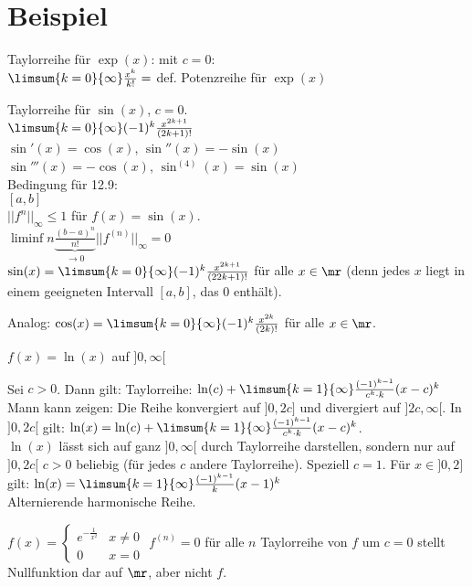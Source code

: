 \section{Beispiel}
	\item  Taylorreihe für $ \exp(x) $: mit $ c=0 $:\\
	$ \limsum{k=0}{\infty}\frac{x^k}{k!}= $ def. Potenzreihe für $ \exp(x) $
	\item  Taylorreihe für $ \sin(x) $, $ c=0 $.\\
	$ \limsum{k=0}{\infty}(-1)^k\frac{x^{2k+1}}{(2k+1)!} $\\
	$ \sin'(x)=\cos(x) $, $ \sin''(x)=-\sin(x) $\\
	$ \sin'''(x)=-\cos(x) $, $ \sin^{(4)}(x)=\sin(x) $\\
	Bedingung für 12.9:\\
	$ [a,b] $\\
	$ ||f^n||_\infty\leq 1 $ für $ f(x)=\sin(x) $.\\
	$ \liminf{n}\underbrace{\frac{(b-a)^n}{n!}}_{\rightarrow 0}||f^{(n)}||_\infty=0 $\\
	$ \sin(x)=\limsum{k=0}{\infty}(-1)^k\frac{x^{2k+1}}{(22k+1)!} $ für alle $ x\in\mr $ (denn jedes $ x $ liegt in einem geeigneten Intervall $ [a,b] $, das 0 enthält).
	\item Analog: $ \cos(x)=\limsum{k=0}{\infty}(-1)^k\frac{x^{2k}}{(2k)!} $ für alle $ x\in\mr $.
	\item $ f(x)=\ln(x) $ auf $ ]0,\infty[ $
	
	Sei $ c>0 $. Dann gilt:
	Taylorreihe: $ \ln(c)+\limsum{k=1}{\infty}\frac{(-1)^{k-1}}{c^k\cdot k}(x-c)^k $\\
	Mann kann zeigen: Die Reihe konvergiert auf $ ]0,2c] $ und divergiert auf $ ]2c,\infty[ $. In $ ]0,2c[ $ gilt: $ \ln(x)=\ln(c)+\limsum{k=1}{\infty}\frac{(-1)^{k-1}}{c^k\cdot k}(x-c)^k $.\\
	$ \ln(x) $ lässt sich auf ganz $ ]0,\infty[ $ durch Taylorreihe darstellen, sondern nur auf $ ]0,2c[ $ $ c>0 $ beliebig (für jedes $ c $ andere Taylorreihe). Speziell $ c=1 $. Für $ x\in]0,2] $ gilt: $ \ln(x)=\limsum{k=1}{\infty}\frac{(-1)^{k-1}}{k}(x-1)^k $\\
	Alternierende harmonische Reihe.
	\item  $ f(x)=\begin{cases}e^{-\frac{1}{x^2}}&x\neq 0\\0&x=0\end{cases} $
	$ f^{(n)}=0 $ für alle $ n $ Taylorreihe von $ f $ um $ c=0 $ stellt Nullfunktion dar auf $ \mr $, aber nicht $ f $.
	\subExEnd

